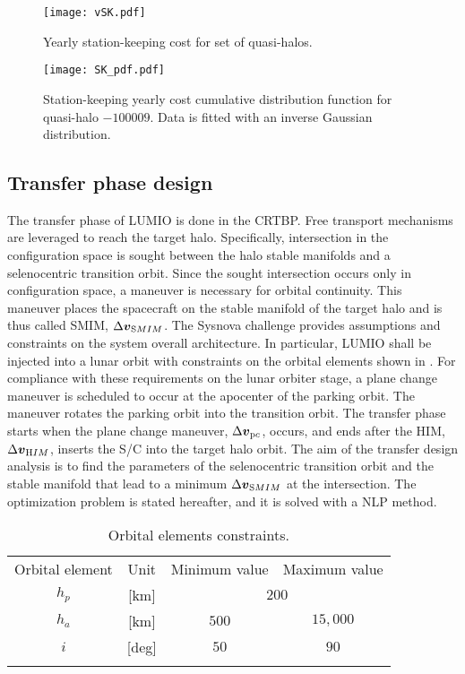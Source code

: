%
%
\begin{figure}[]
	\centering
	\texttt{[image: vSK.pdf]}
	\caption{Yearly station-keeping cost for set of quasi-halos.}
	\label{fig:YearlySKcost}
\end{figure}
%
%
\begin{figure}[t]
	\centering
	\texttt{[image: SK\_pdf.pdf]}
	\caption{Station-keeping yearly cost cumulative distribution function for quasi-halo $-100009$. Data is fitted with an inverse Gaussian distribution.}
	\label{fig:Halo9distribution}
\end{figure}
%


\subsection{Transfer phase design}\label{subsec:Transfer phase design}
The transfer phase of LUMIO is done in the CRTBP. Free transport mechanisms are leveraged to reach the target halo. Specifically, intersection in the configuration space is sought between the halo stable manifolds and a selenocentric transition orbit. Since the sought intersection occurs only in configuration space, a maneuver is necessary for orbital continuity. This maneuver places the spacecraft on the stable manifold of the target halo and is thus called {SMIM}, $\Delta\boldsymbol{v}_{\textrm SMIM}$. The Sysnova challenge provides assumptions and constraints on the system overall architecture. In particular, LUMIO shall be injected into a lunar orbit with constraints on the orbital elements shown in . For compliance with these requirements on the lunar orbiter stage, a plane change maneuver is scheduled to occur at the apocenter of the parking orbit. The maneuver rotates the parking orbit into the transition orbit. The transfer phase starts when the plane change maneuver, $\Delta\boldsymbol{v}_{\textrm pc}$, occurs, and ends after the {HIM}, $\Delta\boldsymbol{v}_{\textrm HIM}$, inserts the {S/C} into the target halo orbit. The aim of the transfer design analysis is to find the parameters of the selenocentric transition orbit and the stable manifold that lead to a minimum $\Delta\boldsymbol{v}_{\textrm SMIM}$ at the intersection. The optimization problem is stated hereafter, and it is solved with a {NLP} method.
%
\begin{table}[]
	\caption{Orbital elements constraints.}
	\label{tab:OrbitalElementsConstraints}
	\centering
	\begin{tabular}{cccc}
		\TOPlines
		Orbital element & Unit & Minimum value & Maximum value \\
		\MIDline
		$h_p$ & [km] & \multicolumn{2}{c}{$200$} \\
		$h_a$ & [km] & $500$ & $15,000$ \\
		$i$ & [deg] & $50$ & $90$ \\
		\BOTTOMlines
	\end{tabular}
\end{table}
%

